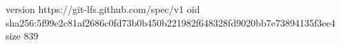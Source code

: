 version https://git-lfs.github.com/spec/v1
oid sha256:5f99e2c81af2686c0fd73b0b450b221982f648328fd9020bb7e73894135f3ee4
size 839
